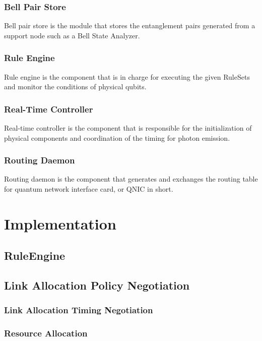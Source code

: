 \subsubsection{Bell Pair Store}
Bell pair store is the module that stores the entanglement pairs generated from a support node such as a Bell State Analyzer.

\subsubsection{Rule Engine}
Rule engine is the component that is in charge for executing the given RuleSets and monitor the conditions of physical qubits.

\subsubsection{Real-Time Controller}
Real-time controller is the component that is responsible for the initialization of physical components and coordination of the timing for photon emission.

\subsubsection{Routing Daemon}
Routing daemon is the component that generates and exchanges the routing table for quantum network interface card, or QNIC in short.

\section{Implementation}

\subsection{RuleEngine}
\subsection{Link Allocation Policy Negotiation}
\subsubsection{Link Allocation Timing Negotiation}
\subsubsection{Resource Allocation}


